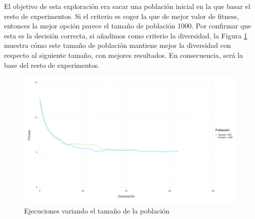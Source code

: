 El objetivo de esta exploración era sacar una población inicial en la que basar el resto de experimentos. Si el criterio
es coger la que de mejor valor de fitness, entonces la mejor opción parece el tamaño de población 1000. Por confirmar que
esta es la decisión correcta, si añadimos como criterio la diversidad, la Figura \ref{fig:population_size_variation_diversity}
muestra cómo este tamaño de población mantiene mejor la diversidad con respecto al siguiente tamaño, con mejores 
resultados. En consecuencia, será la base del resto de experimentos.

\begin{figure}[]
	\centering	
	\includegraphics[scale=0.5]{figuras/population_size_variation_diversity.png}
	\caption{ Ejecuciones variando el tamaño de la población }
    \label{fig:population_size_variation_diversity}
\end{figure}
